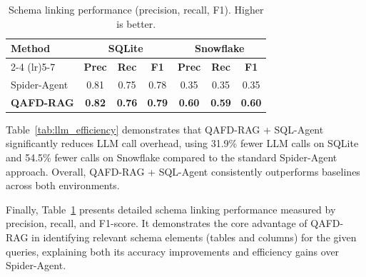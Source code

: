 \documentclass{article} %
\begin{document}
\begin{table}[t]
\centering
\caption{{Schema linking performance (precision, recall, F1). Higher is better.}}
\label{tab:schema_linking}  %
{
\begin{tabular}{lcccccc}
\toprule
\textbf{Method} 
& \multicolumn{3}{c}{\textbf{SQLite}} 
& \multicolumn{3}{c}{\textbf{Snowflake}} \\
\cmidrule(lr){2-4} \cmidrule(lr){5-7}
& \textbf{Prec} & \textbf{Rec} & \textbf{F1} 
& \textbf{Prec} & \textbf{Rec} & \textbf{F1} \\
\midrule
Spider-Agent & 0.81 & 0.75 & 0.78 & 0.35 & 0.35 & 0.35 \\
\textbf{QAFD-RAG} & \textbf{0.82} & \textbf{0.76} & \textbf{0.79} & \textbf{0.60} & \textbf{0.59} & \textbf{0.60} \\
\bottomrule
\end{tabular}
}
\end{table}

{
Table~\ref{tab:llm_efficiency} demonstrates that QAFD-RAG + SQL-Agent significantly reduces LLM call overhead, using 31.9\% fewer LLM calls on SQLite and 54.5\% fewer calls on Snowflake compared to the standard Spider-Agent approach. Overall, QAFD-RAG + SQL-Agent consistently outperforms baselines across both environments.
}

{
Finally, Table~\ref{tab:schema_linking} presents detailed schema linking performance measured by precision, recall, and F1-score. It demonstrates the core advantage of QAFD-RAG in identifying relevant schema elements (tables and columns) for the given queries, explaining both its accuracy improvements and efficiency gains over Spider-Agent.
}
\end{document}

